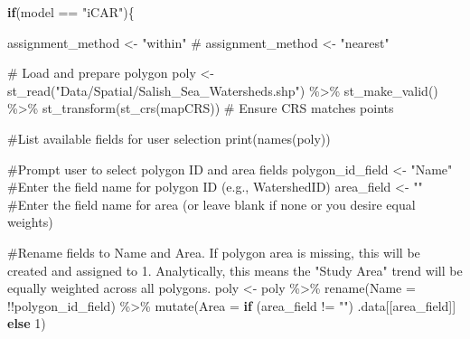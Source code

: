 \documentclass[
  letterpaper,
  DIV=11,
  numbers=noendperiod]{scrreprt}
\newenvironment{Shaded}{\begin{snugshade}}{\end{snugshade}}
\newcommand{\AttributeTok}[1]{\textcolor[rgb]{0.40,0.45,0.13}{#1}}
\newcommand{\CommentTok}[1]{\textcolor[rgb]{0.37,0.37,0.37}{#1}}
\newcommand{\ControlFlowTok}[1]{\textcolor[rgb]{0.00,0.23,0.31}{\textbf{#1}}}
\newcommand{\DecValTok}[1]{\textcolor[rgb]{0.68,0.00,0.00}{#1}}
\newcommand{\FunctionTok}[1]{\textcolor[rgb]{0.28,0.35,0.67}{#1}}
\newcommand{\NormalTok}[1]{\textcolor[rgb]{0.00,0.23,0.31}{#1}}
\newcommand{\OtherTok}[1]{\textcolor[rgb]{0.00,0.23,0.31}{#1}}
\newcommand{\SpecialCharTok}[1]{\textcolor[rgb]{0.37,0.37,0.37}{#1}}
\newcommand{\StringTok}[1]{\textcolor[rgb]{0.13,0.47,0.30}{#1}}
\begin{document}
\begin{Shaded}
\begin{Highlighting}[]
\ControlFlowTok{if}\NormalTok{(model }\SpecialCharTok{==} \StringTok{"iCAR"}\NormalTok{)\{}
  
\NormalTok{  assignment\_method }\OtherTok{\textless{}{-}} \StringTok{"within"}  
\CommentTok{\# assignment\_method \textless{}{-} "nearest"}
  
\CommentTok{\# Load and prepare polygon}
\NormalTok{  poly }\OtherTok{\textless{}{-}} \FunctionTok{st\_read}\NormalTok{(}\StringTok{"Data/Spatial/Salish\_Sea\_Watersheds.shp"}\NormalTok{) }\SpecialCharTok{\%\textgreater{}\%} 
    \FunctionTok{st\_make\_valid}\NormalTok{() }\SpecialCharTok{\%\textgreater{}\%} 
    \FunctionTok{st\_transform}\NormalTok{(}\FunctionTok{st\_crs}\NormalTok{(mapCRS))  }\CommentTok{\# Ensure CRS matches points}
  
\CommentTok{\#List available fields for user selection}
  \FunctionTok{print}\NormalTok{(}\FunctionTok{names}\NormalTok{(poly))}

\CommentTok{\#Prompt user to select polygon ID and area fields}
\NormalTok{  polygon\_id\_field }\OtherTok{\textless{}{-}} \StringTok{"Name"} \CommentTok{\#Enter the field name for polygon ID (e.g., \textquotesingle{}WatershedID\textquotesingle{})}
\NormalTok{  area\_field }\OtherTok{\textless{}{-}} \StringTok{""} \CommentTok{\#Enter the field name for area (or leave blank if none or you desire equal weights)}

\CommentTok{\#Rename fields to \textquotesingle{}Name\textquotesingle{} and \textquotesingle{}Area\textquotesingle{}. If polygon area is missing, this will be created and assigned to 1. Analytically, this means the "Study Area" trend will be equally weighted across all polygons. }
\NormalTok{  poly }\OtherTok{\textless{}{-}}\NormalTok{ poly }\SpecialCharTok{\%\textgreater{}\%}
  \FunctionTok{rename}\NormalTok{(}\AttributeTok{Name =} \SpecialCharTok{!!}\NormalTok{polygon\_id\_field) }\SpecialCharTok{\%\textgreater{}\%}
  \FunctionTok{mutate}\NormalTok{(}\AttributeTok{Area =} \ControlFlowTok{if}\NormalTok{ (area\_field }\SpecialCharTok{!=} \StringTok{""}\NormalTok{) .data[[area\_field]] }\ControlFlowTok{else} \DecValTok{1}\NormalTok{)}
  

\end{Highlighting}
\end{Shaded}
\end{document}
